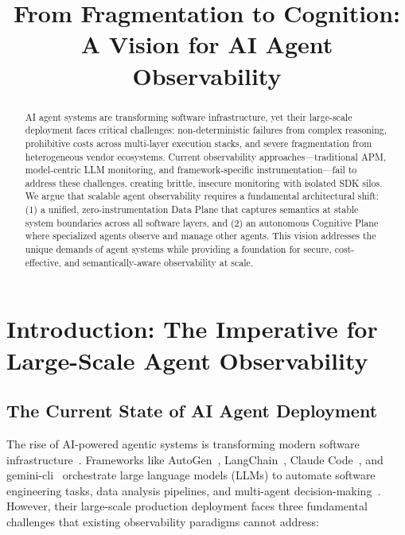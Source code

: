 \documentclass[sigplan,screen，review,9pt]{acmart}
\begin{document}
\title{From Fragmentation to Cognition: A Vision for AI Agent Observability}


\author{}


\sloppy
\begin{abstract}
AI agent systems are transforming software infrastructure, yet their large-scale deployment faces critical challenges: non-deterministic failures from complex reasoning, prohibitive costs across multi-layer execution stacks, and severe fragmentation from heterogeneous vendor ecosystems. Current observability approaches—traditional APM, model-centric LLM monitoring, and framework-specific instrumentation—fail to address these challenges, creating brittle, insecure monitoring with isolated SDK silos. We argue that scalable agent observability requires a fundamental architectural shift: (1) a unified, zero-instrumentation Data Plane that captures semantics at stable system boundaries across all software layers, and (2) an autonomous Cognitive Plane where specialized agents observe and manage other agents. This vision addresses the unique demands of agent systems while providing a foundation for secure, cost-effective, and semantically-aware observability at scale.
\end{abstract}


\maketitle



\section{Introduction: The Imperative for Large-Scale Agent Observability}

\subsection{The Current State of AI Agent Deployment}

The rise of AI-powered agentic systems is transforming modern software infrastructure~\cite{wang2024survey,guo2024survey}. Frameworks like AutoGen~\cite{autogen}, LangChain~\cite{langchain}, Claude Code~\cite{claudecode}, and gemini-cli~\cite{geminicli} orchestrate large language models (LLMs) to automate software engineering tasks, data analysis pipelines, and multi-agent decision-making~\cite{tran2025survey}. However, their large-scale production deployment faces three fundamental challenges that existing observability paradigms cannot address:
\end{document}
